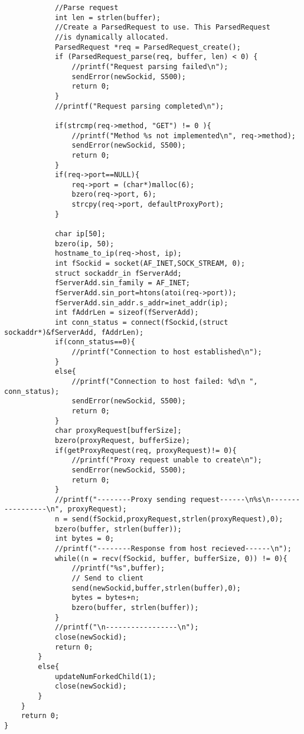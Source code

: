 \documentclass[11pt,a4paper,titlepage]{article}
\begin{document}
\begin{lstlisting}
			//Parse request 
			int len = strlen(buffer); 
			//Create a ParsedRequest to use. This ParsedRequest
			//is dynamically allocated.
			ParsedRequest *req = ParsedRequest_create();
			if (ParsedRequest_parse(req, buffer, len) < 0) {
				//printf("Request parsing failed\n");
				sendError(newSockid, S500);
				return 0;
			}
			//printf("Request parsing completed\n");

			if(strcmp(req->method, "GET") != 0 ){
				//printf("Method %s not implemented\n", req->method);
				sendError(newSockid, S500);
				return 0;
			}
			if(req->port==NULL){
				req->port = (char*)malloc(6);
				bzero(req->port, 6);
				strcpy(req->port, defaultProxyPort);
			}

			char ip[50];
			bzero(ip, 50);
			hostname_to_ip(req->host, ip);
			int fSockid = socket(AF_INET,SOCK_STREAM, 0); 
			struct sockaddr_in fServerAdd;
			fServerAdd.sin_family = AF_INET;
			fServerAdd.sin_port=htons(atoi(req->port));
			fServerAdd.sin_addr.s_addr=inet_addr(ip);
			int fAddrLen = sizeof(fServerAdd);
			int conn_status = connect(fSockid,(struct sockaddr*)&fServerAdd, fAddrLen);
			if(conn_status==0){
				//printf("Connection to host established\n");
			}
			else{
				//printf("Connection to host failed: %d\n ", conn_status);
				sendError(newSockid, S500);
				return 0;
			}
			char proxyRequest[bufferSize];	
			bzero(proxyRequest, bufferSize);
			if(getProxyRequest(req, proxyRequest)!= 0){
				//printf("Proxy request unable to create\n");
				sendError(newSockid, S500);
				return 0;
			}
			//printf("--------Proxy sending request------\n%s\n-----------------\n", proxyRequest);
			n = send(fSockid,proxyRequest,strlen(proxyRequest),0);
			bzero(buffer, strlen(buffer));
			int bytes = 0;
			//printf("--------Response from host recieved------\n");
			while((n = recv(fSockid, buffer, bufferSize, 0)) != 0){
				//printf("%s",buffer);
				// Send to client
				send(newSockid,buffer,strlen(buffer),0);
				bytes = bytes+n;
				bzero(buffer, strlen(buffer));
			}
			//printf("\n-----------------\n");
			close(newSockid);
			return 0;
		}
		else{
			updateNumForkedChild(1);
			close(newSockid);
		}
	}
	return 0;
}

\end{lstlisting}
\end{document}
